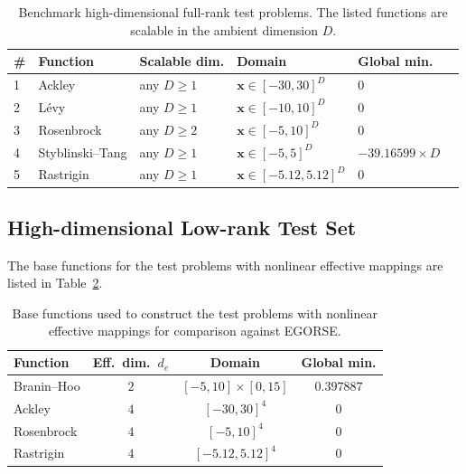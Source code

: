 \documentclass[pdflatex,sn-mathphys-num]{sn-jnl}%
\theoremstyle{thmstyleone}%
\theoremstyle{thmstyletwo}%
\theoremstyle{thmstylethree}%
\begin{document}
\begin{appendices}
\begin{table}[h]
\centering
\caption{Benchmark high-dimensional full-rank test problems. The listed functions
are scalable in the ambient dimension \(D\).}
\label{tab:full-rank-test-problems}
\begin{tabular}{llllll}
\toprule
\# & Function & Scalable dim. & Domain & Global min. \\
\midrule
1 & Ackley & any \(D\geq 1\)  & \(\mathbf{x}\in[-30,30]^D\) & $0$ \\
2 & L\'evy & any \(D\geq 1\) & \(\mathbf{x}\in[-10,10]^D\) & $0$ \\
3 & Rosenbrock & any \(D\geq 2\)  & \(\mathbf{x}\in[-5,10]^D\) & $0$ \\
4 & Styblinski--Tang & any \(D\geq 1\)  & \(\mathbf{x}\in[-5,5]^D\) & $-39.16599\times D$\\
5 & Rastrigin & any \(D\geq 1\) & \(\mathbf{x}\in[-5.12,5.12]^D\) & $0$ \\
\bottomrule
\end{tabular}
\end{table}

\subsection{High-dimensional Low-rank Test Set}\label{Appendix High-dimensional Low-rank Test Set}

The base functions for the test problems with nonlinear effective mappings are listed in Table~\ref{tab:egorse-base-functions}.

\begin{table}[htbp]
  \centering
  \caption{Base functions used to construct the test problems with nonlinear effective mappings for comparison against EGORSE.}
  \label{tab:egorse-base-functions}
  \begin{tabular}{lccc}
    \toprule
    Function & Eff.\ dim.\ $d_e$ & Domain & Global min. \\
    \midrule
    Branin--Hoo \cite{Ernesto2005} & $2$ & $[-5,10]\times[0,15]$
      & $0.397887$ \\
    Ackley \cite{Ernesto2005} & $4$ & $[-30,30]^4$
      & $0$ \\
    Rosenbrock \cite{Surjanovic2013} & $4$ & $[-5, 10]^4$
      & $0$ \\
    Rastrigin \cite{Surjanovic2013} & $4$ & $[-5.12,5.12]^4$
      & $0$ \\
    \bottomrule
  \end{tabular}
\end{table}


\end{appendices}
\end{document}
